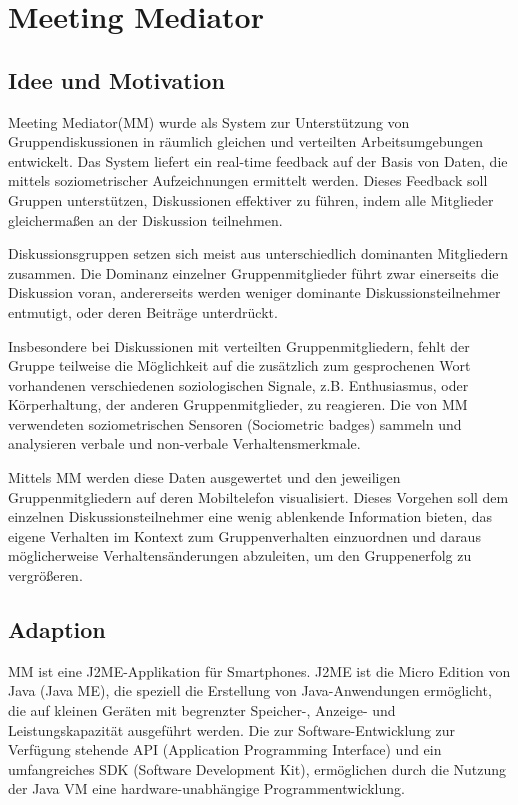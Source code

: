 \section{Meeting Mediator}

\subsection{Idee und Motivation}
Meeting Mediator(MM) \cite{KimChaHolPent2008} wurde als System zur
Un\-ter\-stütz\-ung von Gruppendiskussionen in räumlich gleichen und verteilten
Arbeitsumgebungen entwickelt. Das System liefert ein real-time feedback auf der
Basis von Daten, die mittels soziometrischer Aufzeichnungen ermittelt werden.
Dieses Feedback soll Gruppen unterstützen, Diskussionen effektiver zu führen,
indem alle Mitglieder gleichermaßen an der Diskussion teilnehmen.

Diskussionsgruppen setzen sich meist aus unterschiedlich dominanten Mitgliedern
zusammen. Die Dominanz einzelner Gruppenmitglieder führt zwar einerseits die
Diskussion voran, andererseits werden weniger dominante Diskussionsteilnehmer 
entmutigt, oder deren Beiträge un\-ter\-drückt.

Insbesondere bei Diskussionen mit verteilten Gruppenmitgliedern, fehlt der
Gruppe teilweise die Möglichkeit auf die zusätzlich zum gesprochenen Wort
vorhandenen verschiedenen soziologischen Signale, z.B. Enthusiasmus, oder
Körperhaltung, der anderen Gruppenmitglieder, zu reagieren.
Die von MM verwendeten soziometrischen Sensoren (Sociometric badges)
\cite{MITbadge} sammeln und analysieren verbale und non-verbale
Verhaltensmerkmale.

Mittels MM werden diese Daten ausgewertet und den jeweiligen Gruppenmitgliedern
auf deren Mobiltelefon visualisiert. Dieses Vorgehen soll dem einzelnen
Diskussionsteilnehmer eine wenig ablenkende Information bieten, das eigene
Verhalten im Kontext zum Gruppenverhalten einzuordnen und daraus möglicherweise
Ver\-hal\-tens\-än\-de\-run\-gen abzuleiten, um den Gruppenerfolg zu
vergrößeren.

\subsection{Adaption}

MM ist eine J2ME-Applikation für Smartphones. J2ME \cite{J2ME} ist die Micro
Edition von Java (Java ME), die speziell die Erstellung von Java-Anwendungen
ermöglicht, die auf kleinen Geräten mit begrenzter Speicher-, Anzeige- und
Leistungskapazität ausgeführt werden. Die zur Software-Ent\-wick\-lung zur
Verfügung stehende API (Application Programming Interface) und ein umfangreiches
SDK (Software Development Kit), ermöglichen durch die Nutzung der Java VM eine
hardware-un\-ab\-hän\-gi\-ge Programmentwicklung.

